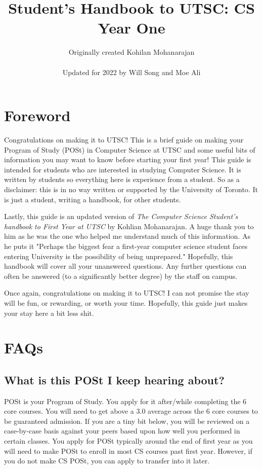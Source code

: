 \documentclass[11pt]{article}
\title{Student's Handbook to UTSC: CS Year One}
\author{Originally created Kohilan Mohanarajan \\ 
\\ Updated for 2022 by Will Song and Moe Ali}
\begin{document}
\maketitle
\newpage
\tableofcontents
\newpage
\section{Foreword}

Congratulations on making it to UTSC\@! This is a brief guide on
making your Program of Study (POSt) in Computer Science at UTSC
and some useful bits of information you may want to know before
starting your first year! This guide is intended for students who
are interested in studying Computer Science. It is written by
students so everything here is experience from a student. So as a
disclaimer: this is in no way written or supported by the University
of Toronto. It is just a student, writing a handbook, for other
students.

Lastly, this guide is an updated version of \textit{The Computer Science
Student's handbook to First Year at UTSC} by Kohlian Mohanarajan. A huge
thank you to him as he was the one who helped me understand much of
this information. As he puts it "Perhaps the biggest fear a first-year
computer science student faces entering University is the possibility
of being unprepared." Hopefully, this handbook will cover all your
unanswered questions. Any further questions can often be answered (to
a significantly better degree) by the staff on campus.

Once again,
congratulations on making it to UTSC\@! I can not promise the stay will be
fun, or rewarding, or worth your time. Hopefully, this guide just makes
your stay here a bit less shit.

\section{FAQs}
\subsection{What is this POSt I keep hearing about?} 
POSt is your Program of Study. You apply for it after/while completing
the 6 core courses. You will need to get above a 3.0 average across
the 6 core courses to be guaranteed admission. If you are a tiny bit
below, you will be reviewed on a case-by-case basis against your peers
based upon how well you performed in certain classes. You apply for POSt
typically around the end of first year as you will need to make POSt to
enroll in most CS courses past first year. However, if you do not make
CS POSt, you can apply to transfer into it later.
\end{document}
